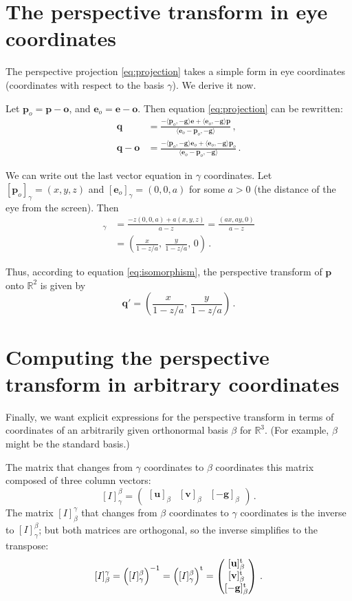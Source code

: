 \documentclass[12pt]{article}
\newcommand{\real}{\mathbb{R}}
\providecommand{\pe}{\mathbf{e}}
\providecommand{\vg}{\mathbf{g}}
\providecommand{\vu}{\mathbf{u}}
\providecommand{\vv}{\mathbf{v}}
\providecommand{\po}{\mathbf{o}}
\providecommand{\pp}{\mathbf{p}}
\providecommand{\pq}{\mathbf{q}}
\providecommand{\transpose}[1]{#1^{\mathrm{t}}}
\begin{document}
\section{The perspective transform in eye coordinates}

The perspective projection 
\eqref{eq:projection}
takes a simple form in eye coordinates (coordinates 
with respect to the basis $\gamma$).
We derive it now.

Let $\pp_o = \pp - \po$, and $\pe_o = \pe - \po$.
Then equation \eqref{eq:projection} can be rewritten:
\begin{align*}
\pq &= 
\frac{
-\langle \pp_o, -\vg \rangle \pe
+\langle \pe_o, -\vg \rangle \pp  
}
{\langle \pe_o - \pp_o, -\vg \rangle}\,, \\
\pq - \po &=  
\frac{
-\langle \pp_o, -\vg \rangle \pe_o
+\langle \pe_o, -\vg \rangle \pp_o  
}
{\langle \pe_o - \pp_o, -\vg \rangle}\,.
\end{align*}

We can write out the last vector equation in $\gamma$ coordinates.
Let $[\pp_o]_\gamma = (x, y, z)$ and $[\pe_o]_\gamma = (0, 0, a)$ for some $a > 0$ (the distance of the eye from the screen).
Then
\begin{align*}
[\pq - \po]_\gamma &= \frac{-z(0, 0, a) + a(x,y,z)}{a - z} =
\frac{(ax, ay, 0)}{a -z} 
\\ &= 
\left( \frac{x}{1-z/a}, \, \frac{y}{1-z/a}, \, 0 \right)\,.
\end{align*}

Thus, according to equation \eqref{eq:isomorphism},
the perspective transform of $\pp$ onto $\real^2$
is given by
\begin{equation}
\label{eq:perspective-gamma}
\pq' = \left( \frac{x}{1-z/a}, \, \frac{y}{1-z/a}\right)\,.
\end{equation}

\section{Computing the perspective transform in arbitrary coordinates}

Finally, we want explicit expressions for the perspective transform
in terms of coordinates of an arbitrarily given orthonormal basis
$\beta$ for $\real^3$.  (For example, $\beta$ might be the standard basis.)

The matrix that changes
from $\gamma$ coordinates to $\beta$ coordinates
this matrix composed of three column vectors:
\[
[I]^\beta_\gamma = \begin{pmatrix}
[\vu]_\beta &
[\vv]_\beta &
[-\vg]_\beta
\end{pmatrix}\,.
\]
The matrix $[I]^\gamma_\beta$ that changes 
from $\beta$ coordinates to $\gamma$ coordinates
is the inverse to $[I]_\gamma^\beta$;
but both matrices are orthogonal,
so the inverse simplifies to the transpose:
\[
[I]_\beta^\gamma = 
\Bigl( [I]^\beta_\gamma \Bigr)^{-1} =
\transpose{\Bigl( [I]^\beta_\gamma \Bigr)}
= 
\begin{pmatrix}
\transpose{[\vu]_\beta} \\
\transpose{[\vv]_\beta} \\
\transpose{[-\vg]_\beta}
\end{pmatrix}\,.
\]
\end{document}
